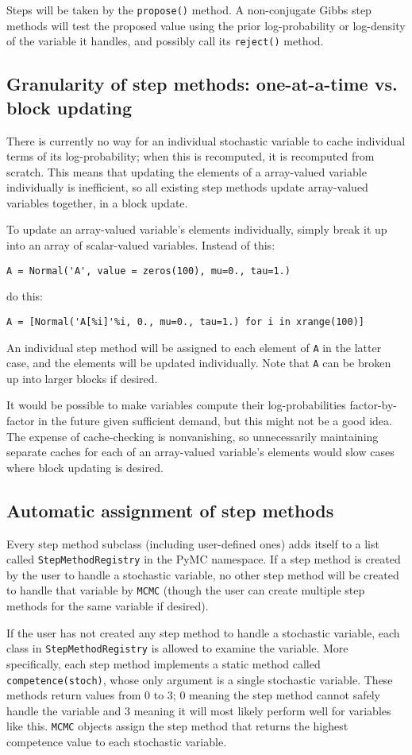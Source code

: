 Steps will be taken by the \texttt{propose()} method. A non-conjugate Gibbs step methods will test the proposed value using the prior log-probability or log-density of the variable it handles, and possibly call its \texttt{reject()} method.

\subsection{Granularity of step methods: one-at-a-time vs. block updating} 
There is currently no way for an individual stochastic variable to cache individual terms of its log-probability; when this is recomputed, it is recomputed from scratch. This means that updating the elements of a array-valued variable individually is inefficient, so all existing step methods update array-valued variables together, in a block update.

To update an array-valued variable's elements individually, simply break it up into an array of scalar-valued variables. Instead of this:
\begin{verbatim}
A = Normal('A', value = zeros(100), mu=0., tau=1.)    
\end{verbatim}
do this:
\begin{verbatim}
A = [Normal('A[%i]'%i, 0., mu=0., tau=1.) for i in xrange(100)]
\end{verbatim}
An individual step method will be assigned to each element of \texttt{A} in the latter case, and the elements will be updated individually. Note that \texttt{A} can be broken up into larger blocks if desired.

It would be possible to make variables compute their log-probabilities factor-by-factor in the future given sufficient demand, but this might not be a good idea. The expense of cache-checking is nonvanishing, so unnecessarily maintaining separate caches for each of an array-valued variable's elements would slow cases where block updating is desired. 

\subsection{Automatic assignment of step methods} 
Every step method subclass (including user-defined ones) adds itself to a list called \texttt{StepMethodRegistry} in the PyMC namespace. If a step method is created by the user to handle a stochastic variable, no other step method will be created to handle that variable by \texttt{MCMC} (though the user can create multiple step methods for the same variable if desired). 

If the user has not created any step method to handle a stochastic variable, each class in \texttt{StepMethodRegistry} is allowed to examine the variable. More specifically, each step method implements a static method called \texttt{competence(stoch)}, whose only argument is a single stochastic variable. These methods return values from 0 to 3; 0 meaning the step method cannot safely handle the variable and 3 meaning it will most likely perform well for variables like this. \texttt{MCMC} objects assign the step method that returns the highest competence value to each stochastic variable.